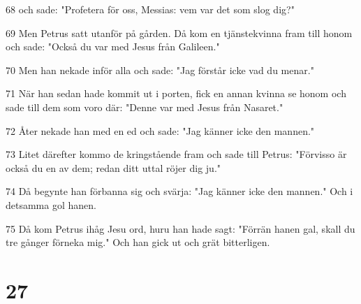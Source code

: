 \par 68 och sade: "Profetera för oss, Messias: vem var det som slog dig?"
\par 69 Men Petrus satt utanför på gården. Då kom en tjänstekvinna fram till honom och sade: "Också du var med Jesus från Galileen."
\par 70 Men han nekade inför alla och sade: "Jag förstår icke vad du menar."
\par 71 När han sedan hade kommit ut i porten, fick en annan kvinna se honom och sade till dem som voro där: "Denne var med Jesus från Nasaret."
\par 72 Åter nekade han med en ed och sade: "Jag känner icke den mannen."
\par 73 Litet därefter kommo de kringstående fram och sade till Petrus: "Förvisso är också du en av dem; redan ditt uttal röjer dig ju."
\par 74 Då begynte han förbanna sig och svärja: "Jag känner icke den mannen." Och i detsamma gol hanen.
\par 75 Då kom Petrus ihåg Jesu ord, huru han hade sagt: "Förrän hanen gal, skall du tre gånger förneka mig." Och han gick ut och grät bitterligen.

\chapter{27}

